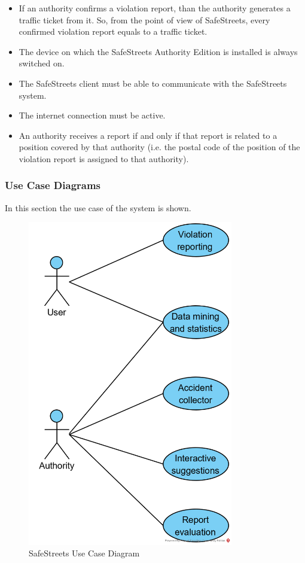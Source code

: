 \documentclass{article}
\newcommand\requirement[1]{\item[{[R#1]}] }
\newcommand\assumption[1]{\item[{[A#1]}] }
\begin{document}
\begin{itemize}
\begin{itemize}
					\assumption{9} If an authority confirms a violation report, than the authority generates a traffic ticket from it. So, from the point of view of 				SafeStreets, every confirmed violation report equals to a traffic ticket.
					\assumption{10} The device on which the SafeStreets Authority Edition is installed is always switched on.
					\requirement{1} The SafeStreets client must be able to communicate with the SafeStreets system.
					\requirement{2} The internet connection must be active.
					\requirement{3} An authority receives a report if and only if that report is related to a position covered by that authority (i.e. the postal code of the position of the violation report is assigned to that authority).
				\end{itemize}
			\end{itemize}
		
			\subsubsection{Use Case Diagrams}
				In this section the use case of the system is shown.
				\begin{figure}[H]
					\centering
					\includegraphics[width=0.8\textwidth]{diagrams/usecase_safestreets.png}
					\caption[SafeStreets use case diagram]{SafeStreets Use Case Diagram}
					\label{fig:usecase_safestreets}
				\end{figure}
			
\end{document}

